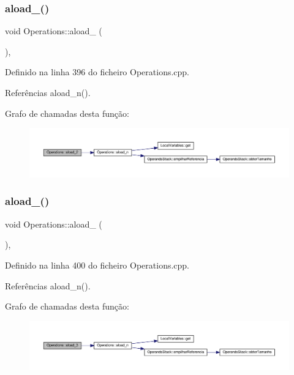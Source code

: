 \subsubsection{\texorpdfstring{aload\+\_()}{aload\_2()}}
{\footnotesize\ttfamily void Operations\+::aload\+\_ (\begin{DoxyParamCaption}{ }\end{DoxyParamCaption})\hspace{0.3cm}{\ttfamily [static]}, {\ttfamily [private]}}



Definido na linha 396 do ficheiro Operations.\+cpp.



Referências aload\+\_\+n().

Grafo de chamadas desta função\+:\nopagebreak
\begin{figure}[H]
\begin{center}
\leavevmode
\includegraphics[width=350pt]{classOperations_abd58f463152d7f88b9fb2f133c6ca184_cgraph}
\end{center}
\end{figure}
\mbox{\label{classOperations_ac0cadd4fe7c17eab1985f11b5389fafc}} 
\subsubsection{\texorpdfstring{aload\+\_()}{aload\_3()}}
{\footnotesize\ttfamily void Operations\+::aload\+\_ (\begin{DoxyParamCaption}{ }\end{DoxyParamCaption})\hspace{0.3cm}{\ttfamily [static]}, {\ttfamily [private]}}



Definido na linha 400 do ficheiro Operations.\+cpp.



Referências aload\+\_\+n().

Grafo de chamadas desta função\+:\nopagebreak
\begin{figure}[H]
\begin{center}
\leavevmode
\includegraphics[width=350pt]{classOperations_ac0cadd4fe7c17eab1985f11b5389fafc_cgraph}
\end{center}
\end{figure}
\mbox{\label{classOperations_ad148cdfeb25166f5c097cee60ea36325}} 
